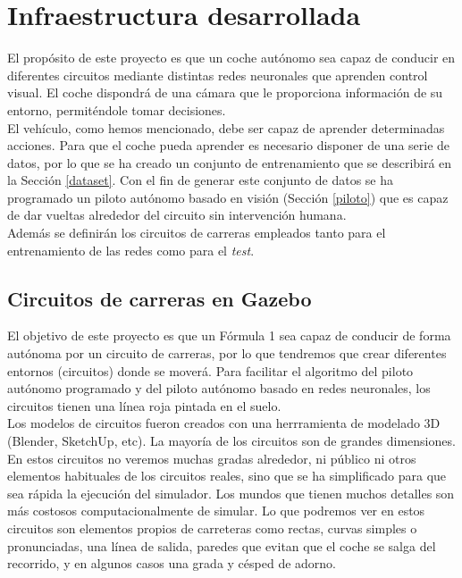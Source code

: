 \chapter{Infraestructura desarrollada}\label{cap.infraestructura}

El propósito de este proyecto es que un coche autónomo sea capaz de conducir en diferentes circuitos mediante distintas redes neuronales que aprenden control visual. El coche dispondrá de una cámara que le proporciona información de su entorno, permiténdole tomar decisiones.\\

El vehículo, como hemos mencionado, debe ser capaz de aprender determinadas acciones. Para que el coche pueda aprender es necesario disponer de una serie de datos, por lo que se ha creado un conjunto de entrenamiento que se describirá en la Sección \ref{dataset}. Con el fin de generar este conjunto de datos se ha programado un piloto autónomo basado en visión (Sección \ref{piloto}) que es capaz de dar vueltas alrededor del circuito sin intervención humana.\\

Además se definirán los circuitos de carreras empleados tanto para el entrenamiento de las redes como para el \textit{test}. 

\section{Circuitos de carreras en Gazebo}\label{modelos_circuitos}

El objetivo de este proyecto es que un Fórmula 1 sea capaz de conducir de forma autónoma por un circuito de carreras, por lo que tendremos que crear diferentes entornos (circuitos) donde se moverá. Para facilitar el algoritmo del piloto autónomo programado y del piloto autónomo basado en redes neuronales, los circuitos tienen una línea roja pintada en el suelo.\\

Los modelos de circuitos fueron creados con una herrramienta de modelado 3D (Blender, SketchUp, etc). La mayoría de los circuitos son de grandes dimensiones. En estos circuitos no veremos muchas gradas alrededor, ni público ni otros elementos habituales de los circuitos reales, sino que se ha simplificado para que sea rápida la ejecución del simulador. Los mundos que tienen muchos detalles son más costosos computacionalmente de simular. Lo que podremos ver en estos circuitos son elementos propios de carreteras como rectas, curvas simples o pronunciadas, una línea de salida, paredes que evitan que el coche se salga del recorrido, y en algunos casos una grada y césped de adorno.\\

